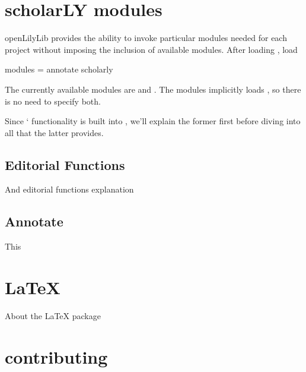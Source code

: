 \documentclass[letterpaper,10pt,english]{sphinxmanual}
\begin{document}
\chapter{scholarLY modules}
\label{\detokenize{modules::doc}}\label{\detokenize{modules:scholarly-modules}}
openLilyLib provides the ability to invoke particular modules needed for each
project without imposing the inclusion of  available modules. After loading
, load

\begin{sphinxVerbatim}[commandchars=\\\{\}]
  
  modules = annotate
 scholarly
\end{sphinxVerbatim}

The currently available modules are  and .
The  modules implicitly loads , so there is no
need to specify both.

Since ` functionality is built into , we'll explain
the former first before diving into all that the latter provides.


\section{Editorial Functions}
\label{\detokenize{modules:editorial-functions}}
And editorial functions explanation


\section{Annotate}
\label{\detokenize{modules:annotate}}
This


\chapter{LaTeX}
\label{\detokenize{latex:latex}}\label{\detokenize{latex::doc}}
About the LaTeX package


\chapter{contributing}
\label{\detokenize{contributing:contributing}}\label{\detokenize{contributing::doc}}


\renewcommand{\indexname}{Index}
\printindex
\end{document}
